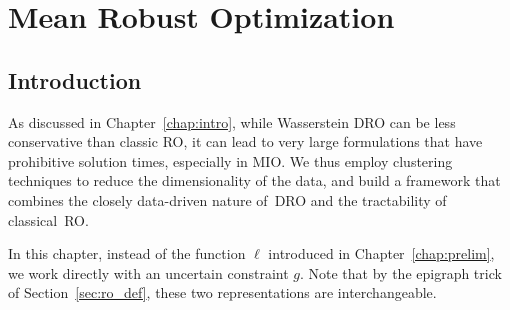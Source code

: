 \chapter{Mean Robust Optimization}
\label{chap:mro}

\glsresetall

\section{Introduction}

As discussed in Chapter~\ref{chap:intro}, while Wasserstein \gls{DRO} can be less conservative than classic \gls{RO}, it can lead to very large formulations that have prohibitive solution times, especially in \gls{MIO}. 
We thus employ clustering techniques to reduce the dimensionality of the data, and build a framework that combines the closely data-driven nature of~\gls{DRO} and the tractability of classical~\gls{RO}.

In this chapter, instead of the function $\ell$ introduced in Chapter~\ref{chap:prelim}, we work directly with an uncertain constraint $g$.
Note that by the epigraph trick of Section~\ref{sec:ro_def}, these two representations are interchangeable. 






